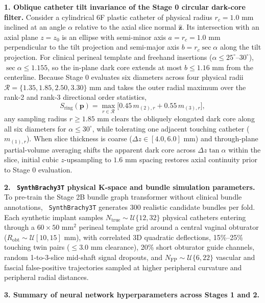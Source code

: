 \documentclass[
  11pt,
]{article}
\let\nforigtexttt\texttt
\renewcommand{\texttt}[1]{\nforigtexttt{\XeTeXinterchartokenstate=1 #1}}
\begin{document}
\textbf{1. Oblique catheter tilt invariance of the Stage 0 circular
dark-core filter.} Consider a cylindrical 6F plastic catheter of
physical radius \(r_c = 1.0\text{ mm}\) inclined at an angle \(\alpha\)
relative to the axial slice normal \(\hat{\mathbf{z}}\). Its
intersection with an axial plane \(z = z_0\) is an ellipse with
semi-minor axis \(a = r_c = 1.0\text{ mm}\) perpendicular to the tilt
projection and semi-major axis \(b = r_c \sec\alpha\) along the tilt
projection. For clinical perineal template and freehand insertions
(\(\alpha \le 25^\circ\text{--}30^\circ\)), \(\sec\alpha \le 1.155\), so
the in-plane dark core extends at most \(b \le 1.16\text{ mm}\) from the
centerline. Because Stage 0 evaluates six diameters across four physical
radii \(\mathcal{R} = \{1.35, 1.85, 2.50, 3.30\}\text{ mm}\) and takes
the outer radial maximum over the rank-2 and rank-3 directional order
statistics,
\[S_{\text{ring}}(\mathbf{p}) = \max_{r \in \mathcal{R}} \big[0.45\, m_{(2),r} + 0.55\, m_{(3),r}\big],\]
any sampling radius \(r \ge 1.85\text{ mm}\) clears the obliquely
elongated dark core along all six diameters for \(\alpha \le 30^\circ\),
while tolerating one adjacent touching catheter (\(m_{(1),r}\)). When
slice thickness is coarse (\(\Delta z \in [4.0, 6.0]\text{ mm}\)) and
through-plane partial-volume averaging shifts the apparent dark core
across \(\Delta z \tan\alpha\) within the slice, initial cubic
\(z\)-upsampling to \(1.6\text{ mm}\) spacing restores axial continuity
prior to Stage 0 evaluation.

\textbf{2. \texttt{SynthBrachy3T} physical K-space and bundle simulation
parameters.} To pre-train the Stage 2B bundle graph transformer without
clinical bundle annotations, \texttt{SynthBrachy3T} generates 300
realistic candidate bundles per fold. Each synthetic implant samples
\(N_{\text{true}} \sim \mathcal{U}\{12, 32\}\) physical catheters
entering through a \(60 \times 50\text{ mm}^2\) perineal template grid
around a central vaginal obturator
(\(R_{\text{obt}} \sim \mathcal{U}[10, 15]\text{ mm}\)), with correlated
3D quadratic deflections, 15\%--25\% touching twin pairs
(\(\le 3.0\text{ mm}\) clearance), 20\% short obturator guide channels,
random 1-to-3-slice mid-shaft signal dropouts, and
\(N_{\text{FP}} \sim \mathcal{U}\{6, 22\}\) vascular and fascial
false-positive trajectories sampled at higher peripheral curvature and
peripheral radial distances.

\textbf{3. Summary of neural network hyperparameters across Stages 1 and
2.}
\end{document}
